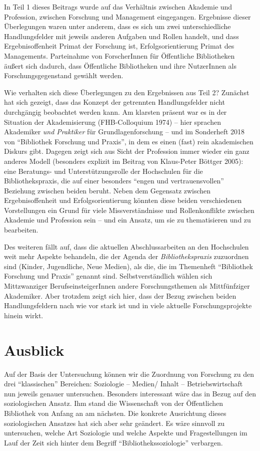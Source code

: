 \documentclass[a4paper,
fontsize=11pt,
oneside,
numbers=noperiodatend,
parskip=half-,
bibliography=totoc,
final
]{scrartcl}
\begin{document}
In Teil 1 dieses Beitrags wurde auf das Verhältnis zwischen Akademie und
Profession, zwischen Forschung und Management eingegangen. Ergebnisse
dieser Überlegungen waren unter anderem, dass es sich um zwei
unterschiedliche Handlungsfelder mit jeweils anderen Aufgaben und Rollen
handelt, und dass Ergebnisoffenheit Primat der Forschung ist,
Erfolgsorientierung Primat des Managements. Parteinahme von
ForscherInnen für Öffentliche Bibliotheken äußert sich dadurch, dass
Öffentliche Bibliotheken und ihre NutzerInnen als Forschungsgegenstand
gewählt werden.

Wie verhalten sich diese Überlegungen zu den Ergebnissen aus Teil 2?
Zunächst hat sich gezeigt, dass das Konzept der getrennten
Handlungsfelder nicht durchgängig beobachtet werden kann. Am klarsten
präsent war es in der Situation der Akademisierung (FHB-Colloquium 1974)
-- hier sprachen Akademiker \emph{und Praktiker} für Grundlagenforschung
-- und im Sonderheft 2018 von \enquote{Bibliothek Forschung und Praxis},
in dem es einen (fast) rein akademischen Diskurs gibt. Dagegen zeigt
sich aus Sicht der Profession immer wieder ein ganz anderes Modell
(besonders explizit im Beitrag von Klaus-Peter Böttger 2005): eine
Beratungs- und Unterstützungsrolle der Hochschulen für die
Bibliothekspraxis, die auf einer besonders \enquote{engen und
vertrauensvollen} Beziehung zwischen beiden beruht. Neben dem Gegensatz
zwischen Ergebnisoffenheit und Erfolgsorientierung könnten diese beiden
verschiedenen Vorstellungen ein Grund für viele Missverständnisse und
Rollenkonflikte zwischen Akademie und Profession sein -- und ein Ansatz,
um sie zu thematisieren und zu bearbeiten.

Des weiteren fällt auf, dass die aktuellen Abschlussarbeiten an den
Hochschulen weit mehr Aspekte behandeln, die der Agenda der
\emph{Bibliothekspraxis} zuzuordnen sind (Kinder, Jugendliche, Neue
Medien), als die, die im Themenheft \enquote{Bibliothek Forschung und
Praxis} genannt sind. Selbstverständlich wählen sich Mittzwanziger
BerufseinsteigerInnen andere Forschungsthemen als Mittfünfziger
Akademiker. Aber trotzdem zeigt sich hier, dass der Bezug zwischen
beiden Handlungsfeldern nach wie vor stark ist und in viele aktuelle
Forschungsprojekte hinein wirkt.

\hypertarget{ausblick}{%
\section{Ausblick}\label{ausblick}}

Auf der Basis der Untersuchung können wir die Zuordnung von Forschung zu
den drei \enquote{klassischen} Bereichen: Soziologie -- Medien/ Inhalt
-- Betriebswirtschaft nun jeweils genauer untersuchen. Besonders
interessant wäre das in Bezug auf den soziologischen Ansatz. Ihm stand
die Wissenschaft von der Öffentlichen Bibliothek von Anfang an am
nächsten. Die konkrete Ausrichtung dieses soziologischen Ansatzes hat
sich aber sehr geändert. Es wäre sinnvoll zu untersuchen, welche Art
Soziologie und welche Aspekte und Fragestellungen im Lauf der Zeit sich
hinter dem Begriff \enquote{Bibliothekssoziologie} verbargen.
\end{document}
